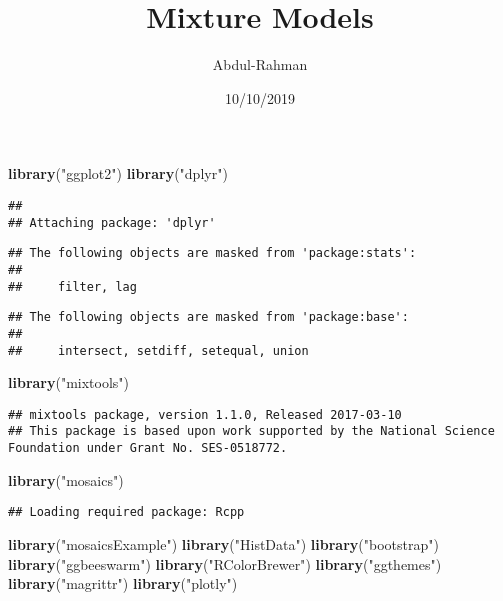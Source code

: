 \documentclass[]{article}
\title{Mixture Models}
\author{Abdul-Rahman}
\date{10/10/2019}
\newenvironment{Shaded}{\begin{snugshade}}{\end{snugshade}}
\newcommand{\KeywordTok}[1]{\textcolor[rgb]{0.13,0.29,0.53}{\textbf{#1}}}
\newcommand{\NormalTok}[1]{#1}
\newcommand{\StringTok}[1]{\textcolor[rgb]{0.31,0.60,0.02}{#1}}
\begin{document}
\maketitle

\begin{Shaded}
\begin{Highlighting}[]
\KeywordTok{library}\NormalTok{(}\StringTok{"ggplot2"}\NormalTok{)}
\KeywordTok{library}\NormalTok{(}\StringTok{"dplyr"}\NormalTok{)}
\end{Highlighting}
\end{Shaded}

\begin{verbatim}
## 
## Attaching package: 'dplyr'
\end{verbatim}

\begin{verbatim}
## The following objects are masked from 'package:stats':
## 
##     filter, lag
\end{verbatim}

\begin{verbatim}
## The following objects are masked from 'package:base':
## 
##     intersect, setdiff, setequal, union
\end{verbatim}

\begin{Shaded}
\begin{Highlighting}[]
\KeywordTok{library}\NormalTok{(}\StringTok{"mixtools"}\NormalTok{)}
\end{Highlighting}
\end{Shaded}

\begin{verbatim}
## mixtools package, version 1.1.0, Released 2017-03-10
## This package is based upon work supported by the National Science Foundation under Grant No. SES-0518772.
\end{verbatim}

\begin{Shaded}
\begin{Highlighting}[]
\KeywordTok{library}\NormalTok{(}\StringTok{"mosaics"}\NormalTok{)}
\end{Highlighting}
\end{Shaded}

\begin{verbatim}
## Loading required package: Rcpp
\end{verbatim}

\begin{Shaded}
\begin{Highlighting}[]
\KeywordTok{library}\NormalTok{(}\StringTok{"mosaicsExample"}\NormalTok{)}
\KeywordTok{library}\NormalTok{(}\StringTok{"HistData"}\NormalTok{)}
\KeywordTok{library}\NormalTok{(}\StringTok{"bootstrap"}\NormalTok{)}
\KeywordTok{library}\NormalTok{(}\StringTok{"ggbeeswarm"}\NormalTok{)}
\KeywordTok{library}\NormalTok{(}\StringTok{"RColorBrewer"}\NormalTok{)  }
\KeywordTok{library}\NormalTok{(}\StringTok{"ggthemes"}\NormalTok{)  }
\KeywordTok{library}\NormalTok{(}\StringTok{"magrittr"}\NormalTok{)  }
\KeywordTok{library}\NormalTok{(}\StringTok{"plotly"}\NormalTok{)  }
\end{Highlighting}
\end{Shaded}
\end{document}
